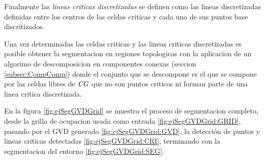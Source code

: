 






Finalmente las \emph{lineas criticas discretizadas} se definen como las lineas
discretizadas \cite{foleyphillips} definidas entre los centros de las celdas
criticas y cada uno de sus puntos base discritizados.

Una vez determinadas las celdas criticas y las lineas criticas discretizadas es
posible obtener la segmentacion en regiones topologicas con la aplicacion de un
algorimo de descomposicion en componentes conexas (seccion
\ref{subsec:CompComp}) donde el conjunto que se descompone es el que se compone
por las celdas libres de $\mathit{CG}$ que no son puntos criticos ni forman parte
de una linea critica discretizada.

En la figura \ref{fig:ejSegGVDGrid} se muestra el proceso de segmentacion
completo, desde la grilla de ocupacion usada como entrada
\ref{fig:ejSegGVDGrid:GRID}, pasando por el GVD generado
\ref{fig:ejSegGVDGrid:GVD}, la detección de puntos y lineas criticas detectadas
\ref{fig:ejSegGVDGrid:CRI}, terminando con la segmentacion del entorno
\ref{fig:ejSegGVDGrid:SEG}.

